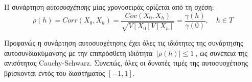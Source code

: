 H συνάρτηση \textit{αυτοσυσχέτισης} μίας χρονοσειράς ορίζεται από τη
σχέση:\\
$$ \rho\left(h \right)=Corr\left( X_0,X_h\right) =\frac{Cov\left( X_0,X_h\right) }{\sqrt{V\left[X_0 \right]V\left[ X_h\right]  }}=\frac{\gamma\left(h \right) }{\gamma\left(0 \right) }, \quad h \in T  $$

Προφανώς η συνάρτηση αυτοσυσχέτησης έχει όλες τις ιδιότητες της συνάρτησης αυτοσυνδιακύμανσης με
την επιπρόσθετη ιδιότητα  $\: \vert \rho \left( h \right)  \vert \leq 1 \: $,  ως συνέπεια της ανισότητας Cauchy-Schwarz. Συνεπώς, όλες οι δυνατές τιμές της αυτοσυσχέτισης βρίσκονται εντός του διαστήματος $\left[-1,1 \right]$. 













\endinput
